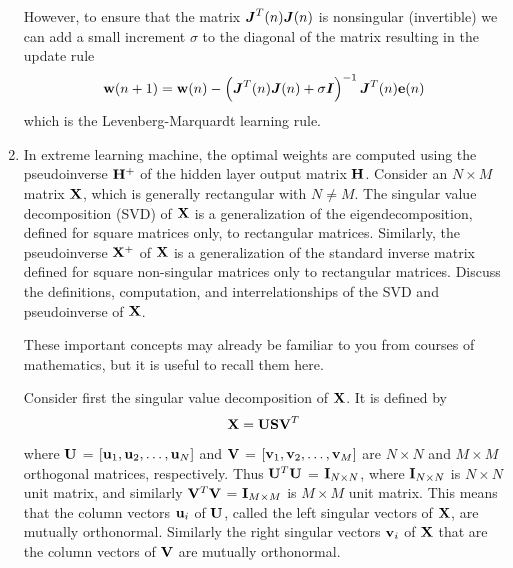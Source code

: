 \begin{enumerate}
\begin{solution}
    However, to ensure that the matrix $\boldsymbol{J}^T(n)\boldsymbol{J}(n)$ is
    nonsingular (invertible) we can add a small increment $\sigma$ to the
    diagonal of the matrix resulting in the update rule
    \[
    {\bf{w}}(n+1) = {\bf{w}}(n) - \left(\boldsymbol{J}^T(n)\boldsymbol{J}(n) + \sigma
      \boldsymbol{I} \right)^{-1}\boldsymbol{J}^T(n){\bf{e}}(n)
    \]
    which is the Levenberg-Marquardt learning rule.
  \end{solution}


\item In extreme learning machine, the optimal weights are computed using the
  pseudoinverse ${\bf H}^+$ of the hidden layer output matrix ${\bf H}$. Consider
  an $N \times M$ matrix ${\bf X}$, which is generally rectangular with $N \neq M$.
  The singular value decomposition (SVD) of ${\bf X}$ is a generalization of the
  eigendecomposition, defined for square matrices only, to rectangular matrices.
  Similarly, the pseudoinverse ${\bf X}^+$ of ${\bf X}$ is a generalization of the
  standard inverse matrix defined for square non-singular matrices only to
  rectangular matrices. Discuss the definitions, computation, and interrelationships
  of the SVD and pseudoinverse of ${\bf X}$.

  \begin{solution}

    These important concepts may already be familiar to you from courses of mathematics,
    but it is useful to recall them here.

    Consider first the singular value decomposition of ${\bf X}$. It is defined by
    \begin{equation}
      {\bf X} = {\bf USV}^T
      \label{eq:SVD}
    \end{equation}
    where ${\bf U}$ = $[{\bf u}_1,{\bf u}_2,\ldots,{\bf u}_N]$ and ${\bf V}$ =
    $[{\bf v}_1,{\bf v}_2,\ldots,{\bf v}_M]$ are $N \times N$ and $M \times M$
    orthogonal matrices, respectively. Thus ${\bf U}^T{\bf U}$ = ${\bf I}_{N \times N}$,
    where ${\bf I}_{N \times N}$ is $N \times N$ unit matrix, and similarly
    ${\bf V}^T{\bf V}$ = ${\bf I}_{M \times M}$ is $M \times M$ unit matrix. This means
    that the column vectors ${\bf u}_i$ of ${\bf U}$, called the left singular vectors
    of ${\bf X}$, are mutually orthonormal. Similarly the right singular vectors
    ${\bf v}_i$ of ${\bf X}$ that are the column vectors of ${\bf V}$ are mutually
    orthonormal.


\end{solution}
\end{enumerate}
